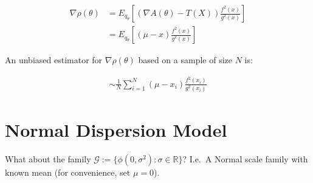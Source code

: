 \documentclass{article}
\begin{document}
\begin{align*}
\nabla \rho(\theta) &= E_{q_{\theta}} \left[ (\nabla A(\theta) - T(X)) \frac{f^{2}(x)}{g^{2}(x)} \right] \\
                    &= E_{q_{\theta}} \left[ (\mu - x) \frac{f^{2}(x)}{g^{2}(x)} \right] 
\end{align*}

An unbiased estimator for $\nabla \rho(\theta)$ based on a sample of size $N$ is:

\begin{align*}
\sim \frac{1}{N} \sum_{i=1}^{N} (\mu-x_i) \frac{f^{2}(x_i)}{g^{2}(x_i)}
\end{align*}



\section{Normal Dispersion Model}

What about the family $\mathcal{G} := \{ \phi(0, \sigma^2) : \sigma \in \mathbb{R} \}$? I.e.\ A Normal scale family with known mean (for convenience, set $\mu = 0$).
\end{document}
